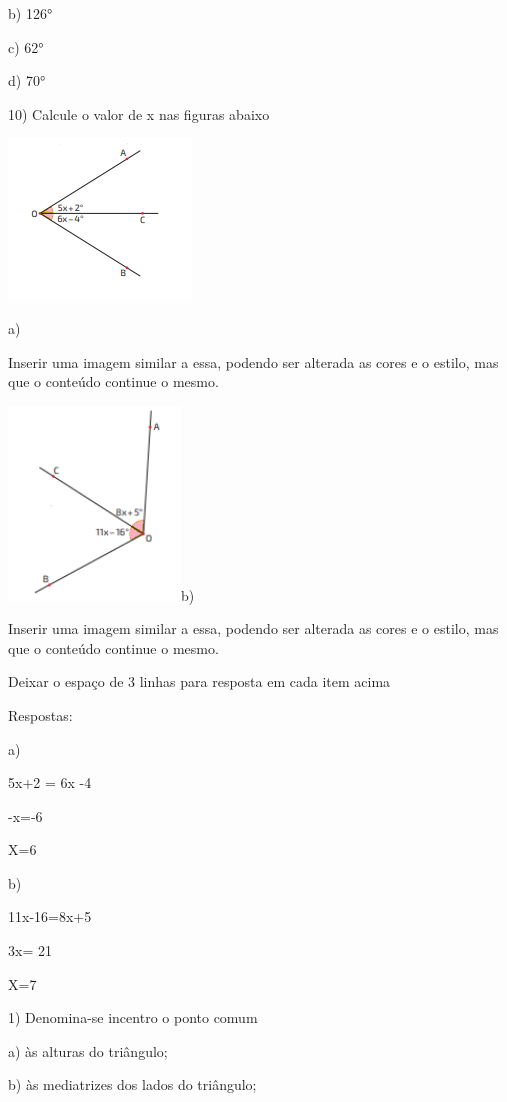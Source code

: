 {b) 126°

c) 62°

d) 70°

10) Calcule o valor de x nas figuras abaixo

\includegraphics[width=1.91667in,height=1.6875in]{./imgSAEB_8_MAT/media/image33.png}

a)

Inserir uma imagem similar a essa, podendo ser alterada as cores e o
estilo, mas que o conteúdo continue o mesmo.

\includegraphics[width=1.80208in,height=2.02917in]{./imgSAEB_8_MAT/media/image34.png}b)

Inserir uma imagem similar a essa, podendo ser alterada as cores e o
estilo, mas que o conteúdo continue o mesmo.

Deixar o espaço de 3 linhas para resposta em cada item acima

Respostas:

a)

5x+2 = 6x -4

-x=-6

X=6

b)

11x-16=8x+5

3x= 21

X=7


1) Denomina-se incentro o ponto comum

a) às alturas do triângulo;

b) às mediatrizes dos lados do triângulo;

}
